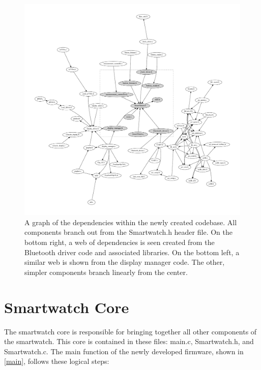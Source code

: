 \begin{figure}[htbp]
    \caption[Organization of New Codebase]{
    A graph of the dependencies within the newly created codebase. All components branch out from the Smartwatch.h header file. On the bottom right, a web of dependencies is seen created from the Bluetooth driver code and associated libraries. On the bottom left, a similar web is shown from the display manager code. The other, simpler components branch linearly from the center.
    }
    \begin{center}
    \includegraphics[width=\textwidth,keepaspectratio]{figs/new_organization.pdf}
    \end{center}
\label{fig:new_organization}
\end{figure}


\section{Smartwatch Core}

The smartwatch core is responsible for bringing together all other components of the smartwatch. This core is contained in these files: main.c, Smartwatch.h, and Smartwatch.c. The main function of the newly developed firmware, shown in \ref{main}, follows these logical steps:

